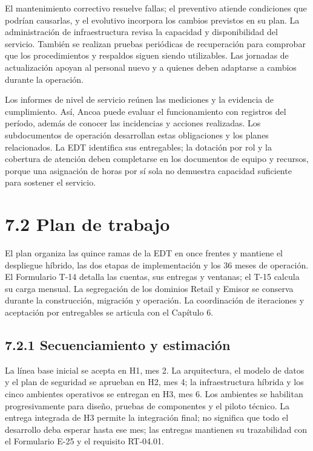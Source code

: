 \documentclass[11pt]{article}
\begin{document}
El mantenimiento correctivo resuelve fallas; el preventivo atiende condiciones que podrían causarlas, y el evolutivo incorpora los cambios previstos en su plan. La administración de infraestructura revisa la capacidad y disponibilidad del servicio. También se realizan pruebas periódicas de recuperación para comprobar que los procedimientos y respaldos siguen siendo utilizables. Las jornadas de actualización apoyan al personal nuevo y a quienes deben adaptarse a cambios durante la operación.

Los informes de nivel de servicio reúnen las mediciones y la evidencia de cumplimiento. Así, Ancoa puede evaluar el funcionamiento con registros del período, además de conocer las incidencias y acciones realizadas. Los subdocumentos de operación desarrollan estas obligaciones y los planes relacionados. La EDT identifica sus entregables; la dotación por rol y la cobertura de atención deben completarse en los documentos de equipo y recursos, porque una asignación de horas por sí sola no demuestra capacidad suficiente para sostener el servicio.


\section{7.2 Plan de trabajo}\label{plan-de-trabajo}

El plan organiza las quince ramas de la EDT en once frentes y mantiene el despliegue híbrido, las dos etapas de implementación y los 36 meses de operación. El Formulario T-14 detalla las cuentas, sus entregas y ventanas; el T-15 calcula su carga mensual. La segregación de los dominios Retail y Emisor se conserva durante la construcción, migración y operación. La coordinación de iteraciones y aceptación por entregables se articula con el Capítulo 6.

\subsection{7.2.1 Secuenciamiento y estimación}

La línea base inicial se acepta en H1, mes 2. La arquitectura, el modelo de datos y el plan de seguridad se aprueban en H2, mes 4; la infraestructura híbrida y los cinco ambientes operativos se entregan en H3, mes 6. Los ambientes se habilitan progresivamente para diseño, pruebas de componentes y el piloto técnico. La entrega integrada de H3 permite la integración final; no significa que todo el desarrollo deba esperar hasta ese mes; las entregas mantienen su trazabilidad con el Formulario E-25 y el requisito RT-04.01.
\end{document}
